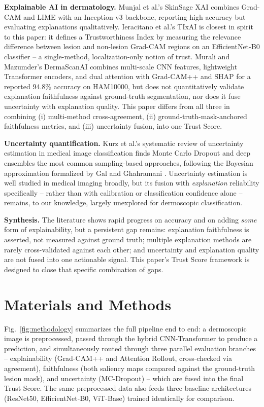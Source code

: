 \documentclass[conference]{IEEEtran}
\begin{document}
\textbf{Explainable AI in dermatology.} Munjal et al.'s SkinSage XAI \cite{munjal2024}
combines Grad-CAM and LIME with an Inception-v3 backbone, reporting high accuracy but
evaluating explanations qualitatively. Ieracitano et al.'s TIxAI \cite{ieracitano2025} is
closest in spirit to this paper: it defines a Trustworthiness Index by measuring the
relevance difference between lesion and non-lesion Grad-CAM regions on an EfficientNet-B0
classifier -- a single-method, localization-only notion of trust. Murali and Mazumder's
DermaScanAI \cite{murali2026} combines multi-scale CNN features, lightweight Transformer
encoders, and dual attention with Grad-CAM++ and SHAP for a reported 94.8\% accuracy on
HAM10000, but does not quantitatively validate explanation faithfulness against
ground-truth segmentation, nor does it fuse uncertainty with explanation quality. This paper
differs from all three in combining (i) multi-method cross-agreement, (ii)
ground-truth-mask-anchored faithfulness metrics, and (iii) uncertainty fusion, into one
Trust Score.

\textbf{Uncertainty quantification.} Kurz et al.'s systematic review of uncertainty
estimation in medical image classification \cite{kurz2022} finds Monte Carlo Dropout and
deep ensembles the most common sampling-based approaches, following the Bayesian
approximation formalized by Gal and Ghahramani \cite{gal2016}. Uncertainty estimation is
well studied in medical imaging broadly, but its fusion with \emph{explanation} reliability
specifically -- rather than with calibration or classification confidence alone -- remains,
to our knowledge, largely unexplored for dermoscopic classification.

\textbf{Synthesis.} The literature shows rapid progress on accuracy and on adding \emph{some}
form of explainability, but a persistent gap remains: explanation faithfulness is asserted,
not measured against ground truth; multiple explanation methods are rarely cross-validated
against each other; and uncertainty and explanation quality are not fused into one
actionable signal. This paper's Trust Score framework is designed to close that specific
combination of gaps.

\section{Materials and Methods}

Fig.~\ref{fig:methodology} summarizes the full pipeline end to end: a dermoscopic image is
preprocessed, passed through the hybrid CNN-Transformer to produce a prediction, and
simultaneously routed through three parallel evaluation branches -- explainability
(Grad-CAM++ and Attention Rollout, cross-checked via agreement), faithfulness (both saliency
maps compared against the ground-truth lesion mask), and uncertainty (MC-Dropout) -- which
are fused into the final Trust Score. The same preprocessed data also feeds three baseline
architectures (ResNet50, EfficientNet-B0, ViT-Base) trained identically for comparison.
\end{document}
